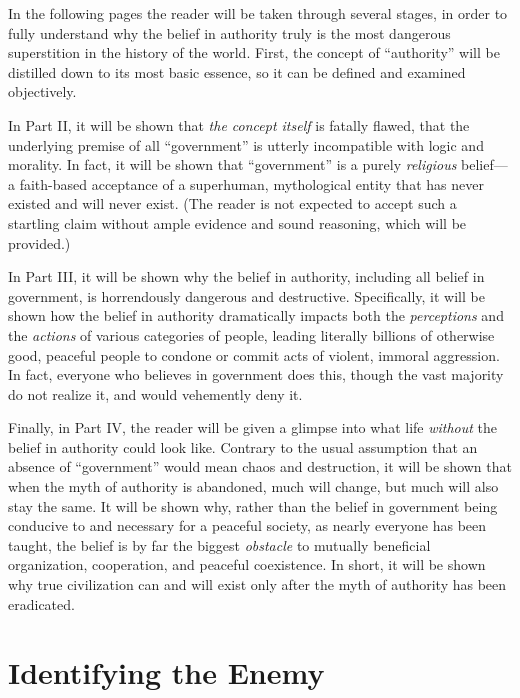 \documentclass{book}
\begin{document}
In the following pages the reader will be taken through several stages, in order to fully understand why the belief in authority truly is the most dangerous superstition in the history of the world. First, the concept of \enquote{authority} will be distilled down to its most basic essence, so it can be defined and examined objectively.

In Part II, it will be shown that \emph{the concept itself} is fatally flawed, that the underlying premise of all \enquote{government} is utterly incompatible with logic and morality. In fact, it will be shown that \enquote{government} is a purely \emph{religious} belief---a faith-based acceptance of a superhuman, mythological entity that has never existed and will never exist. (The reader is not expected to accept such a startling claim without ample evidence and sound reasoning, which will be provided.)

In Part III, it will be shown why the belief in authority, including all belief in government, is horrendously dangerous and destructive. Specifically, it will be shown how the belief in authority dramatically impacts both the \emph{perceptions} and the \emph{actions} of various categories of people, leading literally billions of otherwise good, peaceful people to condone or commit acts of violent, immoral aggression. In fact, everyone who believes in government does this, though the vast majority do not realize it, and would vehemently deny it.

Finally, in Part IV, the reader will be given a glimpse into what life \emph{without} the belief in authority could look like. Contrary to the usual assumption that an absence of \enquote{government} would mean chaos and destruction, it will be shown that when the myth of authority is abandoned, much will change, but much will also stay the same. It will be shown why, rather than the belief in government being conducive to and necessary for a peaceful society, as nearly everyone has been taught, the belief is by far the biggest \emph{obstacle} to mutually beneficial organization, cooperation, and peaceful coexistence. In short, it will be shown why true civilization can and will exist only after the myth of authority has been eradicated.

\section{Identifying the Enemy}
\end{document}
